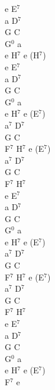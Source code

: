 \documentclass[a5paper, 10pt]{book}
\begin{document}
\begin{minipage}[t]{0.2\textwidth}
  e E$^7$\\
  a D$^7$\\
  G C\\
  G$^0$ a\\
  e H$^7$ e (H$^7$)\\

  e E$^7$\\
  a D$^7$\\
  G C\\
  G$^0$ a\\
  e H$^7$ e (E$^7$)\\

  a$^7$ D$^7$\\
  G C\\
  F$^7$ H$^7$ e (E$^7$)\\
  a$^7$ D$^7$\\
  G C\\
  F$^7$ H$^7$\\

  e E$^7$\\
  a D$^7$\\
  G C\\
  G$^0$ a\\
  e H$^7$ e (E$^7$)\\

  a$^7$ D$^7$\\
  G C\\
  F$^7$ H$^7$ e (E$^7$)\\
  a$^7$ D$^7$\\
  G C\\
  F$^7$ H$^7$\\

  e E$^7$\\
  a D$^7$\\
  G C\\
  G$^0$ a\\
  e H$^7$ e (E$^7$)\\

  F$^7$ e\\
\end{minipage}

\newpage
\end{document}

